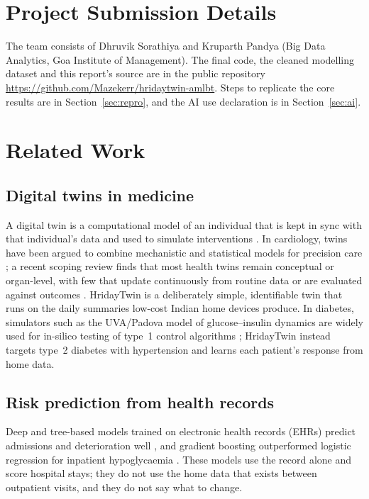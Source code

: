 \documentclass[conference]{IEEEtran}
\newcommand{\RepoURL}{https://github.com/Mazekerr/hridaytwin-amlbt}
\begin{document}
\section{Project Submission Details}
The team consists of Dhruvik Sorathiya and Kruparth Pandya (Big Data Analytics, Goa Institute of Management). The final code, the cleaned modelling dataset and this report's source are in the public repository \url{\RepoURL}. Steps to replicate the core results are in Section~\ref{sec:repro}, and the AI use declaration is in Section~\ref{sec:ai}.

\section{Related Work}
\subsection{Digital twins in medicine} A digital twin is a computational model of an individual that is kept in sync with that individual's data and used to simulate interventions \cite{bjornsson2020}. In cardiology, twins have been argued to combine mechanistic and statistical models for precision care \cite{corral2020}; a recent scoping review finds that most health twins remain conceptual or organ-level, with few that update continuously from routine data or are evaluated against outcomes \cite{katsoulakis2024}. HridayTwin is a deliberately simple, identifiable twin that runs on the daily summaries low-cost Indian home devices produce. In diabetes, simulators such as the UVA/Padova model of glucose--insulin dynamics are widely used for in-silico testing of type~1 control algorithms \cite{man2014}; HridayTwin instead targets type~2 diabetes with hypertension and learns each patient's response from home data.

\subsection{Risk prediction from health records} Deep and tree-based models trained on electronic health records (EHRs) predict admissions and deterioration well \cite{rajkomar2018}, and gradient boosting outperformed logistic regression for inpatient hypoglycaemia \cite{ruan2020}. These models use the record alone and score hospital stays; they do not use the home data that exists between outpatient visits, and they do not say what to change.
\end{document}
